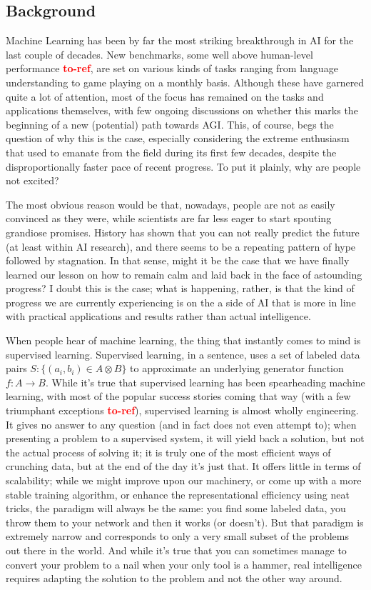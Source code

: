 \documentclass[]{article}
\newcommand\toref{\textcolor{red}{\bf{to-ref}}}
\begin{document}
\subsection{Background}\label{subsec:Background}
Machine Learning has been by far the most striking breakthrough in AI for the last couple of decades. New benchmarks, some well above human-level performance \toref , are set on various kinds of tasks ranging from language understanding to game playing on a monthly basis. Although these have garnered quite a lot of attention, most of the focus has remained on the tasks and applications themselves, with few ongoing discussions on whether this marks the beginning of a new (potential) path towards AGI. This, of course, begs the question of why this is the case, especially considering the extreme enthusiasm that used to emanate from the field during its first few decades, despite the disproportionally faster pace of recent progress. To put it plainly, why are people not excited?

The most obvious reason would be that, nowadays, people are not as easily convinced as they were, while scientists are far less eager to start spouting grandiose promises. History has shown that you can not really predict the future (at least within AI research), and there seems to be a repeating pattern of hype followed by stagnation. In that sense, might it be the case that we have finally learned our lesson on how to remain calm and laid back in the face of astounding progress?
I doubt this is the case; what is happening, rather, is that the kind of progress we are currently experiencing is on the a side of AI that is more in line with practical applications and results rather than actual intelligence.

When people hear of machine learning, the thing that instantly comes to mind is supervised learning. Supervised learning, in a sentence, uses a set of labeled data pairs $S: \{ (a_i, b_i) \in A \otimes B \}$ to approximate an underlying generator function $f: A \rightarrow B$. While it's true that supervised learning has been spearheading machine learning, with most of the popular success stories coming that way (with a few triumphant exceptions \toref ), supervised learning is almost wholly engineering. It gives no answer to any question (and in fact does not even attempt to); when presenting a problem to a supervised system, it will yield back a solution, but not the actual process of solving it; it is truly one of the most efficient ways of crunching data, but at the end of the day it's just that. It offers little in terms of scalability; while we might improve upon our machinery, or come up with a more stable training algorithm, or enhance the representational efficiency using neat tricks, the paradigm will always be the same: you find some labeled data, you throw them to your network and then it works (or doesn't). But that paradigm is extremely narrow and corresponds to only a very small subset of the problems out there in the world. And while it's true that you can sometimes manage to convert your problem to a nail when your only tool is a hammer, real intelligence requires adapting the solution to the problem and not the other way around.
\end{document}
